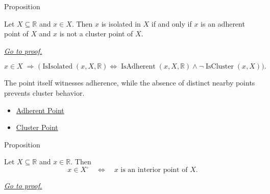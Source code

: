 \begin{propositionbox}{Proposition}
\begin{proposition}
\label{prop:isolated-points-are-noncluster-adherent-points}
Let \(X\subseteq\mathbb{R}\) and \(x\in X\).  Then \(x\) is isolated in
\(X\) if and only if \(x\) is an adherent point of \(X\) and \(x\) is not
a cluster point of \(X\).

\smallskip\noindent
\hyperref[prf:isolated-points-are-noncluster-adherent-points]{\textit{Go to proof.}}
\end{proposition}
\end{propositionbox}

\begin{remark*}
\[
  x\in X
  \;\Longrightarrow\;
  \bigl(\operatorname{IsIsolated}(x,X,\mathbb{R})
  \Longleftrightarrow
  \operatorname{IsAdherent}(x,X,\mathbb{R})\wedge\neg\operatorname{IsCluster}(x,X)\bigr).
\]
\end{remark*}

\begin{remark*}[Interpretation]
The point itself witnesses adherence, while the absence of distinct nearby
points prevents cluster behavior.
\end{remark*}

\begin{dependencies}
\begin{itemize}
  \item \hyperref[def:adherent-point-r]{Adherent Point}
  \item \hyperref[def:cluster-point-r]{Cluster Point}
\end{itemize}
\end{dependencies}

\begin{propositionbox}{Proposition}
\begin{proposition}
\label{prop:interior-membership-characterization}
Let \(X\subseteq\mathbb{R}\) and \(x\in\mathbb{R}\).  Then
\[
  x\in X^\circ
  \quad\Longleftrightarrow\quad
  x\text{ is an interior point of }X.
\]

\smallskip\noindent
\hyperref[prf:interior-membership-characterization]{\textit{Go to proof.}}
\end{proposition}
\end{propositionbox}

